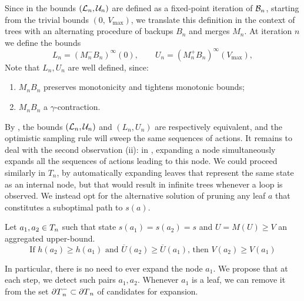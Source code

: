 \documentclass[runningheads]{llncs}
\begin{document}
Since in  the bounds $(\mathcal{L}_n, \mathcal{U}_n)$ are defined as a fixed-point iteration of $\mathcal{B}_n$, starting from the trivial bounds $(0,\, V_{\max})$, we translate this definition in the context of trees with an alternating procedure of backups $B_n$ and merges $M_n$. At iteration $n$ we define the bounds
\begin{equation}
\label{eq:tree-bounds}
L_n = (M_n^- B_n)^\infty(0), \qquad
U_n = (M_n^+ B_n)^\infty(V_{\max}),
\end{equation}
Note that $L_n, U_n$ are well defined, since:
\begin{lemma}[Properties of $M_nB_n$]
	\label{lem:properties-mb}
	\begin{enumerate}[label=(\roman*)]
		\item $M_n B_n$ preserves monotonicity and tightens monotonic bounds;
		\item $M_n B_n$ a $\gamma$-contraction.
	\end{enumerate}
\end{lemma}

By , the bounds $(\mathcal{L}_n, \mathcal{U}_n)$ and $(L_n, U_n)$ are respectively equivalent, and the optimistic sampling rule will sweep the same sequences of actions. It remains to deal with the second observation (ii): in , expanding a node simultaneously expands all the sequences of actions leading to this node. We could proceed similarly in $T_n$, by automatically expanding leaves that represent the same state as an internal node, but that would result in infinite trees whenever a loop is observed. We instead opt for the alternative solution of pruning any leaf $a$ that constitutes a suboptimal path to $s(a)$.


\begin{proposition}
	\label{prop:pruning}
	Let $a_1,a_2\in T_n$ such that state $s(a_1) = s(a_2) = s$ and $U = M(U) \geq V$ an aggregated upper-bound. 
	\begin{equation}
	\label{eq:pruning}
	\text{If } h(a_2) \geq h(a_1) \text{ and } \overline{U}(a_2) \geq \overline{U}(a_1)
	\text{, then }V(a_2) \geq V(a_1)
	\end{equation}
	
	In particular, there is no need to ever expand the node $a_1$. We propose that at each step, we detect such pairs $a_1, a_2$. Whenever $a_1$ is a leaf, we can remove it from the set ${\partial T}_n^-\subset {\partial T}_n $ of candidates for expansion.
\end{proposition}
\end{document}
